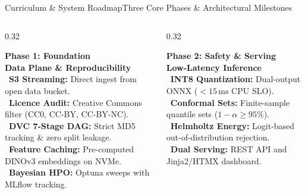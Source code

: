 \documentclass[aspectratio=169,10pt]{beamer}
\begin{document}
\begin{frame}{Curriculum \& System Roadmap}{Three Core Phases \& Architectural Milestones}
    \begin{columns}[T]
        \begin{column}{0.32\textwidth}
            \begin{bluecard}
                \centering
                \textbf{\color{BlueAccent} Phase 1: Foundation}\\[2pt]
                \textbf{\scriptsize Data Plane \& Reproducibility}\\[4pt]
                \RaggedRight\scriptsize
                \textbullet\ \textbf{S3 Streaming:} Direct ingest from open data bucket.\\[3pt]
                \textbullet\ \textbf{Licence Audit:} Creative Commons filter (CC0, CC-BY, CC-BY-NC).\\[3pt]
                \textbullet\ \textbf{DVC 7-Stage DAG:} Strict MD5 tracking \& zero split leakage.\\[3pt]
                \textbullet\ \textbf{Feature Caching:} Pre-computed DINOv3 embeddings on NVMe.\\[3pt]
                \textbullet\ \textbf{Bayesian HPO:} Optuna sweeps with MLflow tracking.
            \end{bluecard}
        \end{column}
        \begin{column}{0.32\textwidth}
            \begin{greencard}
                \centering
                \textbf{\color{GreenAccent} Phase 2: Safety \& Serving}\\[2pt]
                \textbf{\scriptsize Low-Latency Inference}\\[4pt]
                \RaggedRight\scriptsize
                \textbullet\ \textbf{INT8 Quantization:} Dual-output ONNX ($<15\,\text{ms}$ CPU SLO).\\[3pt]
                \textbullet\ \textbf{Conformal Sets:} Finite-sample quantile sets ($1-\alpha \ge 95\%$).\\[3pt]
                \textbullet\ \textbf{Helmholtz Energy:} Logit-based out-of-distribution rejection.\\[3pt]
                \textbullet\ \textbf{Dual Serving:} REST API and Jinja2/HTMX dashboard.\\[3pt]

\end{greencard}
\end{column}
\end{columns}
\end{frame}
\end{document}
